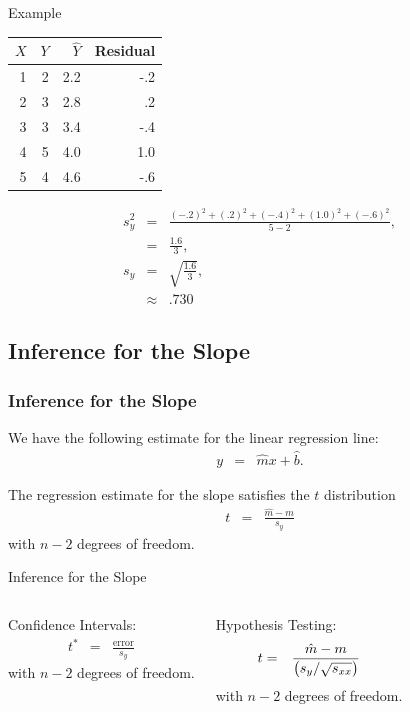 \begin{frame}{Example}

  \begin{tabular}{r|r|r|r}
    $X$ & $Y$ & $\hat{Y}$ & Residual \\ \hline
    1 & 2 & 2.2 & -.2 \\
    2 & 3 & 2.8 &  .2 \\
    3 & 3 & 3.4 & -.4 \\
    4 & 5 & 4.0 & 1.0  \\
    5 & 4 & 4.6 & -.6
  \end{tabular}

  \begin{eqnarray*}
    s^2_y & = & \frac{ (-.2)^2 + (.2)^2 + (-.4)^2 + (1.0)^2 + (-.6)^2}{5-2}, \\
    & = & \frac{1.6}{3}, \\
    s_y & = & \sqrt{\frac{1.6}{3}}, \\
    & \approx & .730
  \end{eqnarray*}
  
\end{frame}
  

\subsection{Inference for the Slope}

\begin{frame}
  \frametitle{Inference for the Slope}

  We have the following estimate for the linear regression line:
  \begin{eqnarray*}
    y & = & \hat{m} x + \hat{b}.
  \end{eqnarray*}

  \begin{definition}
    The regression estimate for the slope satisfies the $t$ distribution
    \begin{eqnarray*}
      t & = & \frac{\hat{m}-m}{s_y}
    \end{eqnarray*}
    with $n-2$ degrees of freedom.
  \end{definition}

\end{frame}


\begin{frame}{Inference for the Slope}

  \begin{columns}

    Confidence Intervals:
    \begin{eqnarray*}
      t^* & = & \frac{\mathrm{error}}{s_y}
    \end{eqnarray*}
    with $n-2$ degrees of freedom.


    Hypothesis Testing:
    \begin{eqnarray*}
      t & = & \frac{\hat{m}-m}{\left( s_y/\sqrt{s_{xx}}\right)}
    \end{eqnarray*}
    with $n-2$ degrees of freedom.

    
  \end{columns}

\end{frame}

